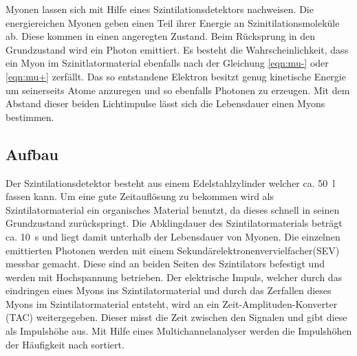 Myonen lassen sich mit Hilfe eines Szintilationsdetektors nachweisen.
Die energiereichen Myonen geben einen Teil ihrer Energie an Szinitilationsmoleküle ab.
Diese kommen in einen angeregten Zustand.
Beim Rücksprung in den Grundzustand wird ein Photon emittiert.
Es besteht die Wahrscheinlichkeit, dass ein Myon im Szinitlatormaterial ebenfalls nach der Gleichung \ref{eqn:mu-}
oder \ref{eqn:mu+} zerfällt.
Das so entstandene Elektron besitzt genug kinetische Energie um seinerseits Atome anzuregen und so ebenfalls Photonen zu erzeugen.
Mit dem Abstand dieser beiden Lichtimpulse lässt sich die Lebensdauer einen Myons bestimmen.

\subsection{Aufbau}
Der Szintilationsdetektor besteht aus einem Edelstahlzylinder welcher ca. \SI{50}{l} fassen kann.
Um eine gute Zeitauflösung zu bekommen wird als Szintilatormaterial ein organisches Material benutzt,
da dieses schnell in seinen Grundzustand zurückspringt.
Die Abklingdauer des Szintilatormaterials beträgt ca. \SI{10}{s} und liegt damit unterhalb der Lebensdauer von Myonen.
Die einzelnen emittierten Photonen werden mit einem Sekundärelektronenvervielfacher(SEV) messbar gemacht.
Diese sind an beiden Seiten des Szintilators befestigt und werden mit Hochspannung betrieben.
Der elektrische Impuls, welcher durch das eindringen eines Myons ins Szintilatormaterial
und durch das Zerfallen dieses Myons im Szintilatormaterial entsteht,
wird an ein Zeit-Amplituden-Konverter (TAC) weitergegeben.
Dieser misst die Zeit zwischen den Signalen und gibt diese als Impulshöhe aus.
Mit Hilfe eines Multichannelanalyser werden die Impulshöhen der Häufigkeit nach sortiert.

